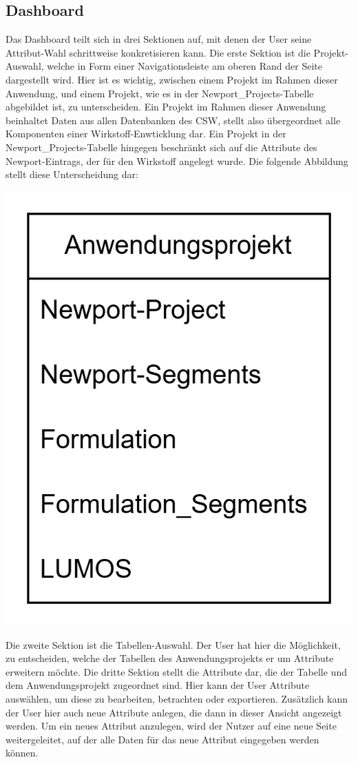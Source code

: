 \subsection{Dashboard}
Das Dashboard teilt sich in drei Sektionen auf, mit denen der User seine Attribut-Wahl schrittweise konkretisieren kann. Die erste Sektion ist die Projekt-Auswahl,
welche in Form einer Navigationsleiste am oberen Rand der Seite dargestellt wird. Hier ist es wichtig, zwischen einem Projekt im Rahmen dieser Anwendung, und einem 
Projekt, wie es in der Newport\_Projects-Tabelle abgebildet ist, zu unterscheiden. Ein Projekt im Rahmen dieser Anwendung beinhaltet Daten aus allen Datenbanken des 
CSW, stellt also übergeordnet alle Komponenten einer Wirkstoff-Enwticklung dar. Ein Projekt in der Newport\_Projects-Tabelle hingegen beschränkt sich auf die Attribute
des Newport-Eintrags, der für den Wirkstoff angelegt wurde. Die folgende Abbildung stellt diese Unterscheidung dar:
\begin{center}
    \includegraphics[width=\linewidth]{./img/projektGrafik.png}
\end{center}
Die zweite Sektion ist die Tabellen-Auswahl. Der User hat hier die Möglichkeit, zu entscheiden, welche der Tabellen des Anwendungsprojekts er um Attribute erweitern möchte.
Die dritte Sektion stellt die Attribute dar, die der Tabelle und dem Anwendungsprojekt zugeordnet sind. Hier kann der User Attribute auswählen, um diese zu bearbeiten, 
betrachten oder exportieren. Zusätzlich kann der User hier auch neue Attribute anlegen, die dann in dieser Ansicht angezeigt werden. Um ein neues Attribut anzulegen,
wird der Nutzer auf eine neue Seite weitergeleitet, auf der alle Daten für das neue Attribut eingegeben werden können.

